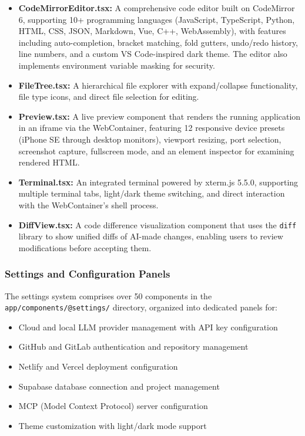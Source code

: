 \documentclass[12pt,a4paper,openany]{report}
\begin{document}
\begin{itemize}
    \item \textbf{CodeMirrorEditor.tsx:} A comprehensive code editor built on CodeMirror 6, supporting 10+ programming languages (JavaScript, TypeScript, Python, HTML, CSS, JSON, Markdown, Vue, C++, WebAssembly), with features including auto-completion, bracket matching, fold gutters, undo/redo history, line numbers, and a custom VS Code-inspired dark theme. The editor also implements environment variable masking for security.
    \item \textbf{FileTree.tsx:} A hierarchical file explorer with expand/collapse functionality, file type icons, and direct file selection for editing.
    \item \textbf{Preview.tsx:} A live preview component that renders the running application in an iframe via the WebContainer, featuring 12 responsive device presets (iPhone SE through desktop monitors), viewport resizing, port selection, screenshot capture, fullscreen mode, and an element inspector for examining rendered HTML.
    \item \textbf{Terminal.tsx:} An integrated terminal powered by xterm.js 5.5.0, supporting multiple terminal tabs, light/dark theme switching, and direct interaction with the WebContainer's shell process.
    \item \textbf{DiffView.tsx:} A code difference visualization component that uses the \texttt{diff} library to show unified diffs of AI-made changes, enabling users to review modifications before accepting them.
\end{itemize}

\subsubsection{Settings and Configuration Panels}
The settings system comprises over 50 components in the \texttt{app/components/@settings/} directory, organized into dedicated panels for:
\begin{itemize}
    \item Cloud and local LLM provider management with API key configuration
    \item GitHub and GitLab authentication and repository management
    \item Netlify and Vercel deployment configuration
    \item Supabase database connection and project management
    \item MCP (Model Context Protocol) server configuration
    \item Theme customization with light/dark mode support
\end{itemize}
\end{document}
